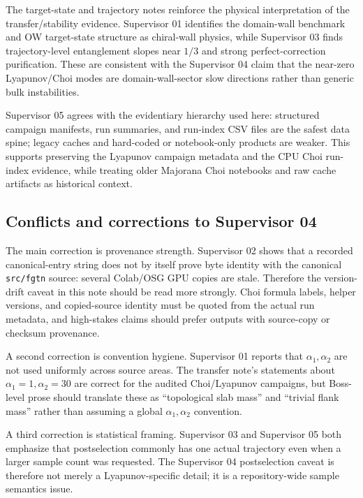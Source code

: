 \documentclass[aps,prb,onecolumn,nofootinbib,superscriptaddress]{revtex4-2}
\begin{document}
The target-state and trajectory notes reinforce the physical interpretation of
the transfer/stability evidence.  Supervisor 01 identifies the domain-wall
benchmark and OW target-state structure as chiral-wall physics, while Supervisor
03 finds trajectory-level entanglement slopes near \(1/3\) and strong
perfect-correction purification.  These are consistent with the Supervisor 04
claim that the near-zero Lyapunov/Choi modes are domain-wall-sector slow
directions rather than generic bulk instabilities.

Supervisor 05 agrees with the evidentiary hierarchy used here: structured
campaign manifests, run summaries, and run-index CSV files are the safest data
spine; legacy caches and hard-coded or notebook-only products are weaker.  This
supports preserving the Lyapunov campaign metadata and the CPU Choi run-index
evidence, while treating older Majorana Choi notebooks and raw cache artifacts
as historical context.

\subsection{Conflicts and corrections to Supervisor 04}

The main correction is provenance strength.  Supervisor 02 shows that a recorded
canonical-entry string does not by itself prove byte identity with the canonical
\texttt{src/fgtn} source: several Colab/OSG GPU copies are stale.  Therefore
the version-drift caveat in this note should be read more strongly.  Choi
formula labels, helper versions, and copied-source identity must be quoted from
the actual run metadata, and high-stakes claims should prefer outputs with
source-copy or checksum provenance.

A second correction is convention hygiene.  Supervisor 01 reports that
\(\alpha_1,\alpha_2\) are not used uniformly across source areas.  The
transfer note's statements about \(\alpha_1=1,\alpha_2=30\) are correct for the
audited Choi/Lyapunov campaigns, but Boss-level prose should translate these as
``topological slab mass'' and ``trivial flank mass'' rather than assuming a
global \(\alpha_1,\alpha_2\) convention.

A third correction is statistical framing.  Supervisor 03 and Supervisor 05 both
emphasize that postselection commonly has one actual trajectory even when a
larger sample count was requested.  The Supervisor 04 postselection caveat is
therefore not merely a Lyapunov-specific detail; it is a repository-wide sample
semantics issue.
\end{document}

